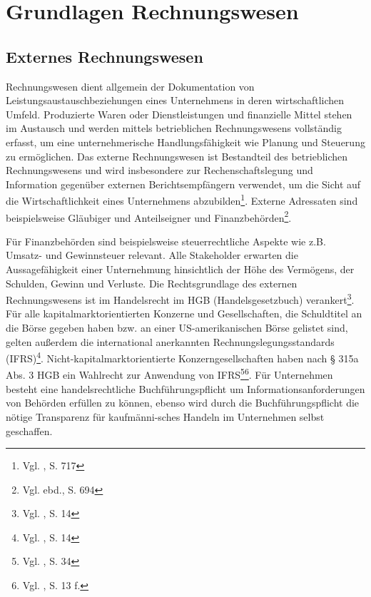\section{Grundlagen Rechnungswesen}

\subsection{Externes Rechnungswesen}
\label{ssec:externesRechnungswesen}
Rechnungswesen dient allgemein der Dokumentation von Leistungsaustauschbeziehungen eines Unternehmens in deren wirtschaftlichen Umfeld. Produzierte Waren oder Dienstleistungen und finanzielle Mittel stehen im Austausch und werden mittels betrieblichen Rechnungswesens vollständig erfasst, um eine unternehmerische Handlungsfähigkeit wie Planung und Steuerung zu ermöglichen. Das externe Rechnungswesen ist Bestandteil des betrieblichen Rechnungswesens und wird insbesondere zur Rechenschaftslegung und Information gegenüber externen Berichtsempfängern verwendet, um die Sicht auf die Wirtschaftlichkeit eines Unternehmens abzubilden\footnote{Vgl. \cite{Wohe2000}, S. 717}. Externe Adressaten sind beispielsweise Gläubiger und Anteilseigner und Finanzbehörden\footnote{Vgl. ebd., S. 694}.

Für Finanzbehörden sind beispielsweise steuerrechtliche Aspekte wie z.B. Umsatz- und Gewinnsteuer relevant. Alle Stakeholder erwarten die Aussagefähigkeit einer Unternehmung hinsichtlich der Höhe des Vermögens, der Schulden, Gewinn und Verluste. 
Die Rechtsgrundlage des externen Rechnungswesens ist im Handelsrecht im  HGB (Handelsgesetzbuch) verankert\footnote{Vgl. \cite{Woltje2008}, S. 14}. Für alle kapitalmarktorientierten Konzerne und Gesellschaften, die Schuldtitel an die Börse gegeben haben bzw. an einer US-amerikanischen Börse gelistet sind, gelten außerdem die international anerkannten Rechnungslegungsstandards (IFRS)\footnote{Vgl. \cite{Klein2010}, S. 14}. Nicht-kapitalmarktorientierte Konzerngesellschaften haben nach § 315a Abs. 3 HGB ein Wahlrecht zur Anwendung von IFRS\footnote{Vgl. \cite{Funk2008}, S. 34}\footnote{Vgl. \cite{Oehler2005}, S. 13 f.}.
Für Unternehmen besteht eine handelsrechtliche Buchführungspflicht um Informationsanforderungen von Behörden erfüllen zu können, ebenso wird durch die Buchführungspflicht die nötige Transparenz für kaufmänni-sches Handeln im Unternehmen selbst geschaffen.

